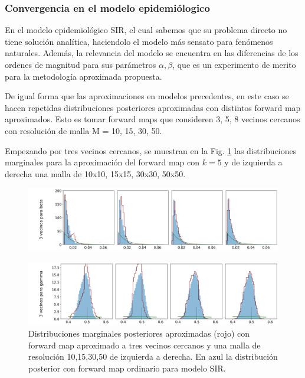 \subsubsection{Convergencia en el modelo epidemiólogico}

En el modelo epidemiológico SIR, el cual sabemos que su problema directo no tiene solución analítica, haciendolo el modelo más sensato para fenómenos naturales. Además, la relevancia del modelo se encuentra en las diferencias de los ordenes de magnitud para sus parámetros $\alpha,\beta$, que es un experimento de merito para la metodología aproximada propuesta.


De igual forma que las aproximaciones en modelos precedentes, en este caso se hacen repetidas distribuciones posteriores aproximadas con distintos forward map aproximados. Esto es tomar forward maps que consideren 3, 5, 8 vecinos cercanos con resolución de malla M = 10, 15, 30, 50.

Empezando por tres vecinos cercanos, se muestran 
en la Fig. \ref{Fig. Aprox SIR 3v} las distribuciones marginales para la aproximación del forward map con $k = 5$ y de izquierda a derecha una malla de 10x10, 15x15, 30x30, 50x50.

\begin{figure}[H] 
    \centering 
    \includegraphics[width = 17 cm ]{img/Exp_Central_SIR_Sigma/Figuras/Generales/Convergencia_theta1_1_SIR_sigma.png} 
\end{figure} 
\begin{figure}[H] 
    \centering 
    \includegraphics[width = 17 cm ]{img/Exp_Central_SIR_Sigma/Figuras/Generales/Convergencia_theta2_1_SIR_sigma.png}
    \caption{Distribuciones marginales posteriores aproximadas (rojo) con forward map aproximado a tres vecinos cercanos y una malla de resolución 10,15,30,50 de izquierda a derecha. En azul la distribución posterior con forward map ordinario para modelo SIR.}
    \label{Fig. Aprox SIR 3v}
\end{figure} 

